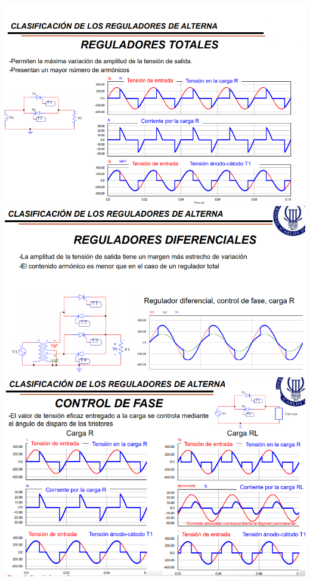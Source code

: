 \documentclass[12pt,a4paper]{article}
\begin{document}
\begin{center}
\includegraphics[scale=0.8]{imagenes/cacare.PNG}\\
\includegraphics[scale=0.8]{imagenes/cacare2.PNG}\\ 
\includegraphics[scale=0.8]{imagenes/cacare3.PNG} 

\end{center}
\end{document}
